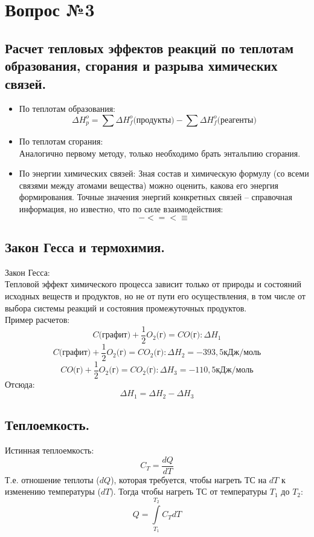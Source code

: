 \documentclass[14pt,a4paper]{scrartcl}
\begin{document}
\section*{Вопрос №3}	

\subsection*{Расчет тепловых эффектов реакций по теплотам образования, сгорания и разрыва химических связей.}
\begin{itemize}
	\item По теплотам образования: 
	$$\Delta{H_{p}^{o}} = \sum \Delta{H_{f}^o} \text{(продукты)} - \sum \Delta{H_{f}^o} \text{(реагенты)}  $$
	\item По теплотам сгорания: \\
	Аналогично первому методу, только необходимо брать энтальпию сгорания.
	\item По энергии химических связей:
	Зная состав и химическую формулу (со всеми связями между атомами вещества) можно оценить, какова его энергия формирования. Точные значения энергий конкретных связей -- справочная информация, но известно, что по силе взаимодействия:
	$$ -  <  =  <  \equiv $$
\end{itemize}
\subsection*{Закон Гесса и термохимия.} 
Закон Гесса: \\
Тепловой эффект химического процесса зависит только от природы и состояний исходных веществ и продуктов, но не от пути его осуществления, в том числе от выбора системы реакций и состояния промежуточных продуктов. \\
Пример расчетов: \\
$$C\text{(графит)} + \frac{1}{2}O_2\text{(г)} = CO\text{(г)}: \Delta{H_1}$$  
$$C\text{(графит)} + \frac{1}{2}O_2\text{(г)} = CO_2\text{(г)}: \Delta{H_2} = -393,5 \text{кДж/моль}$$  			
$$CO\text{(г)} + \frac{1}{2}O_2\text{(г)} = CO_2\text{(г)}: \Delta{H_3} = -110,5 \text{кДж/моль} $$  
Отсюда:
$$\Delta{H_1} = \Delta{H_2} - \Delta{H_3} $$
\subsection*{Теплоемкость.} 		
Истинная теплоемкость:
$$C_T = \dfrac{dQ}{dT} $$
Т.е. отношение теплоты ($dQ$), которая требуется, чтобы нагреть ТС на $dT$ к изменению температуры ($dT$). Тогда чтобы нагреть ТС от температуры $T_1$ до $T_2$:
$$ Q = \int\limits_{T_1}^{T_2} C_T dT $$
\end{document}
